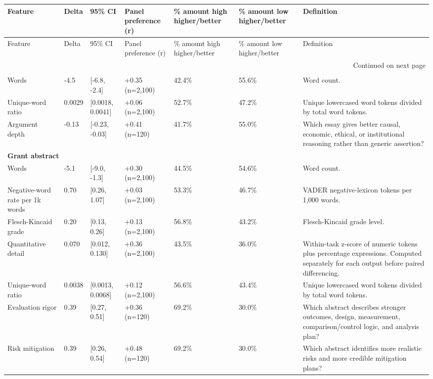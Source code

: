 \begin{longtable}{lllllll}
\toprule
Feature & Delta & 95\% CI & Panel preference (r) & \% amount high higher/better & \% amount low higher/better & Definition \\
\midrule
\endfirsthead
\toprule
Feature & Delta & 95\% CI & Panel preference (r) & \% amount high higher/better & \% amount low higher/better & Definition \\
\midrule
\endhead
\midrule
\multicolumn{7}{r}{Continued on next page} \\
\midrule
\endfoot
\bottomrule
\endlastfoot
\multicolumn{7}{l}{\textbf{Essay writing}} \\
Words & -4.5 & [-6.8, -2.4] & +0.35 (n=2,100) & 42.4\% & 55.6\% & Word count. \\
Unique-word ratio & 0.0029 & [0.0018, 0.0041] & +0.06 (n=2,100) & 52.7\% & 47.2\% & Unique lowercased word tokens divided by total word tokens. \\
Argument depth & -0.13 & [-0.23, -0.03] & +0.41 (n=120) & 41.7\% & 55.0\% & Which essay gives better causal, economic, ethical, or institutional reasoning rather than generic assertion? \\
\multicolumn{7}{l}{\textbf{Grant abstract}} \\
Words & -5.1 & [-9.0, -1.3] & +0.30 (n=2,100) & 44.5\% & 54.6\% & Word count. \\
Negative-word rate per 1k words & 0.70 & [0.26, 1.07] & +0.03 (n=2,100) & 53.3\% & 46.7\% & VADER negative-lexicon tokens per 1,000 words. \\
Flesch-Kincaid grade & 0.20 & [0.13, 0.26] & +0.13 (n=2,100) & 56.8\% & 43.2\% & Flesch-Kincaid grade level. \\
Quantitative detail & 0.070 & [0.012, 0.130] & +0.36 (n=2,100) & 43.5\% & 36.0\% & Within-task z-score of numeric tokens plus percentage expressions. Computed separately for each output before paired differencing. \\
Unique-word ratio & 0.0038 & [0.0013, 0.0068] & +0.12 (n=2,100) & 56.6\% & 43.4\% & Unique lowercased word tokens divided by total word tokens. \\
Evaluation rigor & 0.39 & [0.27, 0.51] & +0.36 (n=120) & 69.2\% & 30.0\% & Which abstract describes stronger outcomes, design, measurement, comparison/control logic, and analysis plan? \\
Risk mitigation & 0.39 & [0.26, 0.54] & +0.48 (n=120) & 69.2\% & 30.0\% & Which abstract identifies more realistic risks and more credible mitigation plans? \\

\end{longtable}
